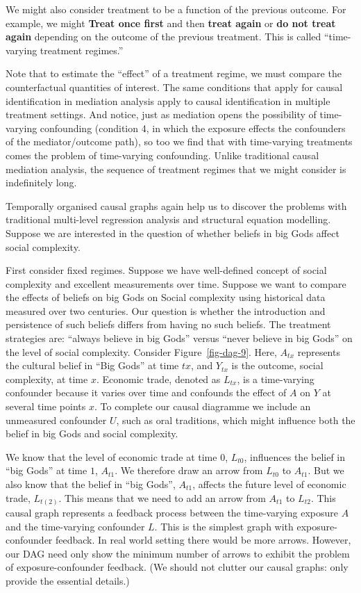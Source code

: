 \documentclass[
  singlecolumn]{report}
\begin{document}
We might also consider treatment to be a function of the previous
outcome. For example, we might \textbf{Treat once first} and then
\textbf{treat again} or \textbf{do not treat again} depending on the
outcome of the previous treatment. This is called ``time-varying
treatment regimes.''

Note that to estimate the ``effect'' of a treatment regime, we must
compare the counterfactual quantities of interest. The same conditions
that apply for causal identification in mediation analysis apply to
causal identification in multiple treatment settings. And notice, just
as mediation opens the possibility of time-varying confounding
(condition 4, in which the exposure effects the confounders of the
mediator/outcome path), so too we find that with time-varying treatments
comes the problem of time-varying confounding. Unlike traditional causal
mediation analysis, the sequence of treatment regimes that we might
consider is indefinitely long.

Temporally organised causal graphs again help us to discover the
problems with traditional multi-level regression analysis and structural
equation modelling. Suppose we are interested in the question of whether
beliefs in big Gods affect social complexity.

First consider fixed regimes. Suppose we have well-defined concept of
social complexity and excellent measurements over time. Suppose we want
to compare the effects of beliefs on big Gods on Social complexity using
historical data measured over two centuries. Our question is whether the
introduction and persistence of such beliefs differs from having no such
beliefs. The treatment strategies are: ``always believe in big Gods''
versus ``never believe in big Gods'' on the level of social complexity.
Consider Figure~\ref{fig-dag-9}. Here, \(A_{tx}\) represents the
cultural belief in ``Big Gods'' at time \(tx\), and \(Y_{tx}\) is the
outcome, social complexity, at time \(x\). Economic trade, denoted as
\(L_{tx}\), is a time-varying confounder because it varies over time and
confounds the effect of \(A\) on \(Y\) at several time points \(x\). To
complete our causal diagramme we include an unmeasured confounder \(U\),
such as oral traditions, which might influence both the belief in big
Gods and social complexity.

We know that the level of economic trade at time \(0\), \(L_{t0}\),
influences the belief in ``big Gods'' at time \(1\), \(A_{t1}\). We
therefore draw an arrow from \(L_{t0}\) to \(A_{t1}\). But we also know
that the belief in ``big Gods'', \(A_{t1}\), affects the future level of
economic trade, \(L_{t(2)}\). This means that we need to add an arrow
from \(A_{t1}\) to \(L_{t2}\). This causal graph represents a feedback
process between the time-varying exposure \(A\) and the time-varying
confounder \(L\). This is the simplest graph with exposure-confounder
feedback. In real world setting there would be more arrows. However, our
DAG need only show the minimum number of arrows to exhibit the problem
of exposure-confounder feedback. (We should not clutter our causal
graphs: only provide the essential details.)
\end{document}

